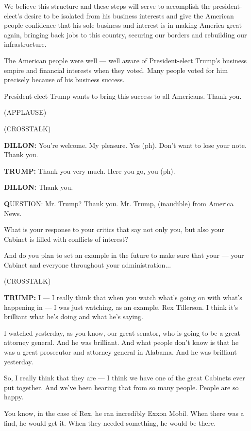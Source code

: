 We believe this structure and these steps will serve to accomplish the
president-elect's desire to be isolated from his business interests and
give the American people confidence that his sole business and interest
is in making America great again, bringing back jobs to this country,
securing our borders and rebuilding our infrastructure.

The American people were well --- well aware of President-elect Trump's
business empire and financial interests when they voted. Many people
voted for him precisely because of his business success.

President-elect Trump wants to bring this success to all Americans.
Thank you.

(APPLAUSE)

(CROSSTALK)

\textbf{DILLON:} You're welcome. My pleasure. Yes (ph). Don't want to
lose your note. Thank you.

\textbf{TRUMP:} Thank you very much. Here you go, you (ph).

\textbf{DILLON:} Thank you.

\textbf{Q}UESTION: Mr. Trump? Thank you. Mr. Trump, (inaudible) from
America News.

What is your response to your critics that say not only you, but also
your Cabinet is filled with conflicts of interest?

And do you plan to set an example in the future to make sure that your
--- your Cabinet and everyone throughout your administration...

(CROSSTALK)

\textbf{TRUMP:} I --- I really think that when you watch what's going on
with what's happening in --- I was just watching, as an example, Rex
Tillerson. I think it's brilliant what he's doing and what he's saying.

I watched yesterday, as you know, our great senator, who is going to be
a great attorney general. And he was brilliant. And what people don't
know is that he was a great prosecutor and attorney general in Alabama.
And he was brilliant yesterday.

So, I really think that they are --- I think we have one of the great
Cabinets ever put together. And we've been hearing that from so many
people. People are so happy.

You know, in the case of Rex, he ran incredibly Exxon Mobil. When there
was a find, he would get it. When they needed something, he would be
there.

